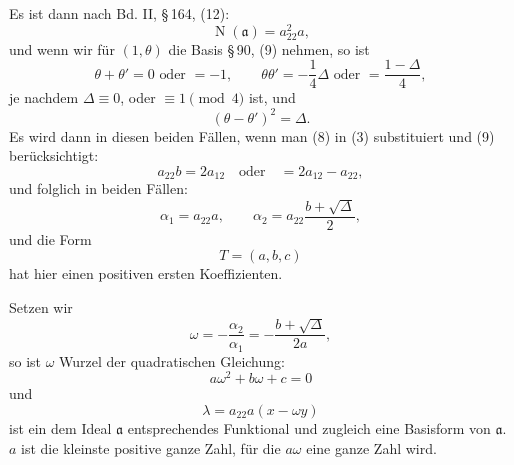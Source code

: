 \documentclass[11pt]{article}
\newcommand{\Norm}{\operatorname{N}}
\begin{document}
Es ist dann nach Bd. II, \S\,164, (12):
\begin{equation}
 \Norm(\mathfrak a)=a_{22}^2a,
\tag{9}
\end{equation}
und wenn wir für $(1,\theta)$ die Basis \S\,90, (9) nehmen, so ist
\begin{equation}
\theta+\theta'=0\text{ oder }=-1,
\qquad
\theta\theta'=-\frac14\Delta\text{ oder }=\frac{1-\Delta}{4},
\tag{10}
\end{equation}
je nachdem $\Delta\equiv0$, oder $\equiv1\pmod4$ ist, und
\[
 (\theta-\theta')^2=\Delta.
\]
Es wird dann in diesen beiden Fällen, wenn man (8) in (3) substituiert und (9) berücksichtigt:
\[
 a_{22}b=2a_{12}\quad\text{oder}\quad =2a_{12}-a_{22},
\]
und folglich in beiden Fällen:
\begin{equation}
 \alpha_1=a_{22}a,
 \qquad
 \alpha_2=a_{22}\frac{b+\sqrt\Delta}{2},
\tag{11}
\end{equation}
und die Form
\[
 T=(a,b,c)
\]
hat hier einen positiven ersten Koeffizienten.

Setzen wir
\begin{equation}
 \omega=-\frac{\alpha_2}{\alpha_1}=-\frac{b+\sqrt\Delta}{2a},
\tag{12}
\end{equation}
so ist $\omega$ Wurzel der quadratischen Gleichung:
\begin{equation}
 a\omega^2+b\omega+c=0
\tag{13}
\end{equation}
und
\begin{equation}
 \lambda=a_{22}a(x-\omega y)
\tag{14}
\end{equation}
ist ein dem Ideal $\mathfrak a$ entsprechendes Funktional und zugleich eine Basisform von $\mathfrak a$. $a$ ist die kleinste positive ganze Zahl, für die $a\omega$ eine ganze Zahl wird.
\end{document}
